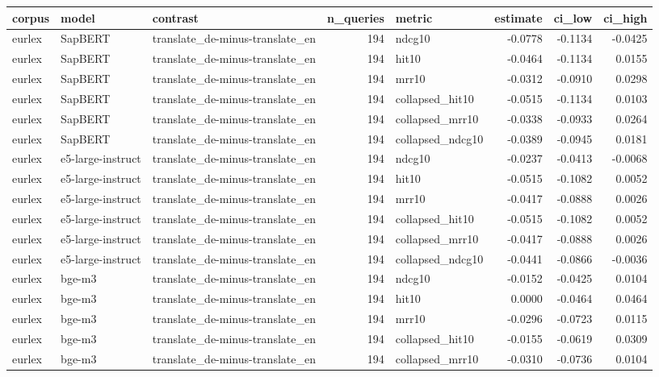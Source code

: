 \begin{tabular}{lllrlrrr}
\toprule
corpus & model & contrast & n\_queries & metric & estimate & ci\_low & ci\_high \\
\midrule
eurlex & SapBERT & translate\_de-minus-translate\_en & 194 & ndcg10 & -0.0778 & -0.1134 & -0.0425 \\
eurlex & SapBERT & translate\_de-minus-translate\_en & 194 & hit10 & -0.0464 & -0.1134 & 0.0155 \\
eurlex & SapBERT & translate\_de-minus-translate\_en & 194 & mrr10 & -0.0312 & -0.0910 & 0.0298 \\
eurlex & SapBERT & translate\_de-minus-translate\_en & 194 & collapsed\_hit10 & -0.0515 & -0.1134 & 0.0103 \\
eurlex & SapBERT & translate\_de-minus-translate\_en & 194 & collapsed\_mrr10 & -0.0338 & -0.0933 & 0.0264 \\
eurlex & SapBERT & translate\_de-minus-translate\_en & 194 & collapsed\_ndcg10 & -0.0389 & -0.0945 & 0.0181 \\
eurlex & e5-large-instruct & translate\_de-minus-translate\_en & 194 & ndcg10 & -0.0237 & -0.0413 & -0.0068 \\
eurlex & e5-large-instruct & translate\_de-minus-translate\_en & 194 & hit10 & -0.0515 & -0.1082 & 0.0052 \\
eurlex & e5-large-instruct & translate\_de-minus-translate\_en & 194 & mrr10 & -0.0417 & -0.0888 & 0.0026 \\
eurlex & e5-large-instruct & translate\_de-minus-translate\_en & 194 & collapsed\_hit10 & -0.0515 & -0.1082 & 0.0052 \\
eurlex & e5-large-instruct & translate\_de-minus-translate\_en & 194 & collapsed\_mrr10 & -0.0417 & -0.0888 & 0.0026 \\
eurlex & e5-large-instruct & translate\_de-minus-translate\_en & 194 & collapsed\_ndcg10 & -0.0441 & -0.0866 & -0.0036 \\
eurlex & bge-m3 & translate\_de-minus-translate\_en & 194 & ndcg10 & -0.0152 & -0.0425 & 0.0104 \\
eurlex & bge-m3 & translate\_de-minus-translate\_en & 194 & hit10 & 0.0000 & -0.0464 & 0.0464 \\
eurlex & bge-m3 & translate\_de-minus-translate\_en & 194 & mrr10 & -0.0296 & -0.0723 & 0.0115 \\
eurlex & bge-m3 & translate\_de-minus-translate\_en & 194 & collapsed\_hit10 & -0.0155 & -0.0619 & 0.0309 \\
eurlex & bge-m3 & translate\_de-minus-translate\_en & 194 & collapsed\_mrr10 & -0.0310 & -0.0736 & 0.0104 \\

\end{tabular}
